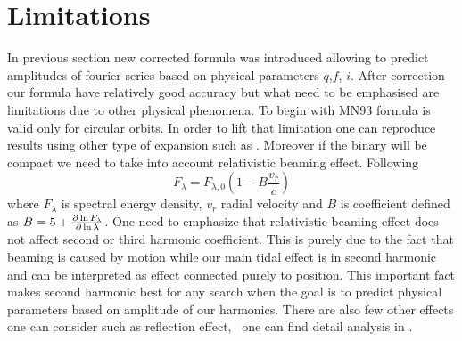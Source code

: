 \documentclass{pracalicmgr}
\begin{document}
\section{Limitations}
In previous section new corrected formula was introduced allowing to predict amplitudes of fourier series based on physical parameters $q$,$f$, $i$. After correction 
our formula have relatively good accuracy but what need to be emphasised are limitations due to other physical phenomena. To begin with MN93 formula is valid only for circular orbits. 
In order to lift that limitation one can reproduce results using other type of expansion such as \citep{engel_beer_2020}. Moreover if the binary will be compact we need to take into account
relativistic beaming effect. Following \citep{loeb_periodic_2003} 
\begin{equation}
    F_{\lambda}=F_{\lambda,0}\left(1-B\frac{v_r}{c}\right)
\end{equation}
where $F_\lambda$ is spectral energy density, $v_r$ radial velocity and $B$ is coefficient defined as $B=5+\pdv{\ln{F_\lambda}}{\ln{\lambda}}$.
One need to emphasize that relativistic beaming effect does not affect second or third harmonic coefficient. This is purely due to the fact that beaming is caused by motion while
our main tidal effect is in second harmonic and can be interpreted as effect connected purely to position. This important fact makes second harmonic best for any search when 
the goal is to predict physical parameters based on amplitude of our harmonics. There are also few other effects one can consider such as reflection effect, \
one can find detail analysis in \citep{gomel_search_2021}.
\end{document}
